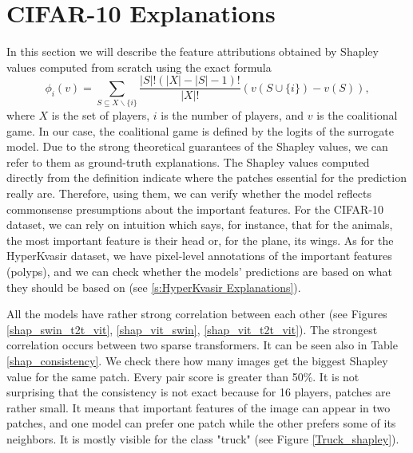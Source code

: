 \documentclass[magisterska,en]{pracamgr}
\begin{document}
\section{CIFAR-10 Explanations}
In this section we will describe the feature attributions obtained by Shapley values computed from scratch using the exact formula
  \begin{equation*}
      \phi_i(v) = \sum_{S\subseteq X\backslash \{i\}} \frac{|S|!(|X|-|S|-1)!}{|X|!}\left(v(S \cup \{i\}) - v(S)\right),
  \end{equation*}
where $X$ is the set of players, $i$ is the number of players, and $v$ is the coalitional game. In our case, the coalitional game is defined by the logits of the surrogate model. Due to the strong theoretical guarantees of the Shapley values, we can refer to them as ground-truth explanations. The Shapley values computed directly from the definition indicate where the patches essential for the prediction really are. Therefore, using them, we can verify whether the model reflects commonsense presumptions about the important features. For the CIFAR-10 dataset, we can rely on intuition which says, for instance, that for the animals, the most important feature is their head or, for the plane, its wings. As for the HyperKvasir dataset, we have pixel-level annotations of the important features (polyps), and we can check whether the models' predictions are based on what they should be based on (see \ref{s:HyperKvasir Explanations}).





All the models have rather strong correlation between each other (see Figures \ref{shap_swin_t2t_vit}, \ref{shap_vit_swin}, \ref{shap_vit_t2t_vit}). The strongest correlation occurs between two sparse transformers. It can be seen also in Table \ref{shap_consistency}. We check there how many images get the biggest Shapley value for the same patch. Every pair score is greater than 50\%. It is not surprising that the consistency is not exact because for 16 players, patches are rather small. It means that important features of the image can appear in two patches, and one model can prefer one patch while the other prefers some of its neighbors. It is mostly visible for the class "truck" (see Figure \ref{Truck_shapley}).
\end{document}
